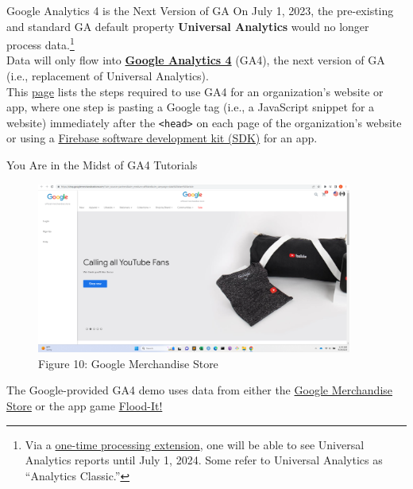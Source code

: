 \documentclass[pdf]{beamer}
\newcommand{\empr}[1]{{\color{franklinblue}\textbf{#1}}}
\theoremstyle{remark}
\theoremstyle{definition}
\begin{document}
\begin{frame}[t]{Google Analytics 4 is the Next Version of GA}
On July 1, 2023, the pre-existing and standard GA default property \empr{Universal Analytics} would no longer process data.\footnote{Via a \href{https://support.google.com/analytics/answer/11583528?hl=en}{one-time processing extension}, one will be able to see Universal Analytics reports until July 1, 2024.  Some refer to Universal Analytics as ``Analytics Classic.''} \\
\vspace{1.5ex}
Data will only flow into \href{https://support.google.com/analytics/answer/10089681?hl=en}{\empr{Google Analytics 4}} (GA4), the next version of GA (i.e., replacement of Universal Analytics). \\
\vspace{1.5ex}
This \href{https://support.google.com/analytics/answer/9304153?hl=en}{page} lists the steps required to use GA4 for an organization's website or app, where one step is pasting a Google tag (i.e., a JavaScript snippet for a website) immediately after the {\color{treegreen} \texttt{<head>}} on each page of the organization's website or using a \href{https://opensource.google/projects/firebasesdk}{Firebase software development kit (SDK)} for an app. \\
\end{frame}

\begin{frame}[t]{You Are in the Midst of GA4 Tutorials}
\begin{figure}[htbp]
  \captionsetup{justification=centering}
  \includegraphics[height=5.6cm, trim=1.5cm 0.0cm 2.0cm 0.0cm width=5.6cm]{Images/GA4_1_091923.png}
  \caption{Figure {\color{franklinblue} 10}: Google Merchandise Store}
\end{figure}
\vspace{-2.0ex}
The Google-provided GA4 demo uses data from either the \href{https://shop.googlemerchandisestore.com/}{Google Merchandise Store} or the app game \href{https://flood-it.app/}{Flood-It!}
\end{frame}
\end{document}
